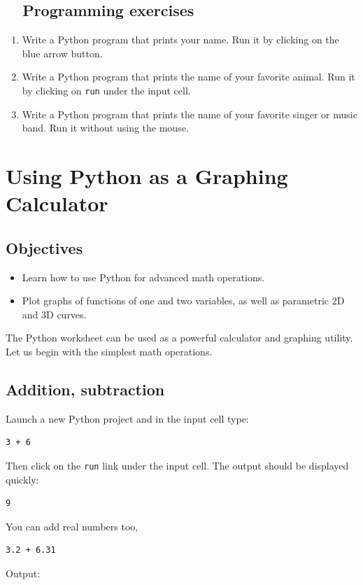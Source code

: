 \subsection{\ \ Programming exercises}

\begin{enumerate}
\item Write a Python program that prints your name. Run it by clicking on the blue arrow button.
\item Write a Python program that prints the name of your favorite animal. 
      Run it by clicking on {\tt run} under the input cell.
\item Write a Python program that prints the name of your favorite singer 
      or music band. Run it without using the mouse.
\end{enumerate}

\section{Using Python as a Graphing Calculator} \label{sec:calc}

\subsection{Objectives}

\begin{itemize}
\item Learn how to use Python for advanced math operations.
\item Plot graphs of functions of one and two variables, as well as parametric 2D and 3D curves.
\end{itemize}
The Python worksheet can be used as a powerful calculator and graphing utility. 
Let us begin with the simplest math operations.

\subsection{Addition, subtraction}

Launch a new Python project and in the input cell type:

\begin{verbatim}
3 + 6
\end{verbatim}
Then click on the {\tt run} link under the input cell. The output should be displayed quickly:

\begin{verbatim}
9
\end{verbatim}
You can add real numbers too,
\begin{verbatim}
3.2 + 6.31
\end{verbatim}
Output:

